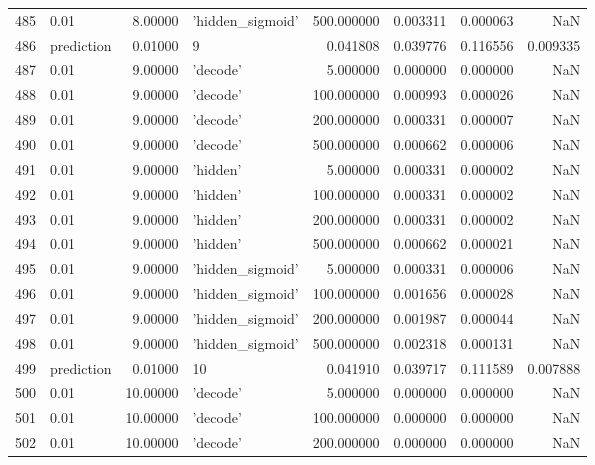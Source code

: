 \documentclass[10pt,a4paper]{article}
\begin{document}
\begin{tabular}{llrlrrrr}
485  &        0.01 &   8.00000 &   'hidden\_sigmoid' &  500.000000 &  0.003311 &  0.000063 &       NaN \\
486  &  prediction &   0.01000 &                  9 &    0.041808 &  0.039776 &  0.116556 &  0.009335 \\
487  &        0.01 &   9.00000 &           'decode' &    5.000000 &  0.000000 &  0.000000 &       NaN \\
488  &        0.01 &   9.00000 &           'decode' &  100.000000 &  0.000993 &  0.000026 &       NaN \\
489  &        0.01 &   9.00000 &           'decode' &  200.000000 &  0.000331 &  0.000007 &       NaN \\
490  &        0.01 &   9.00000 &           'decode' &  500.000000 &  0.000662 &  0.000006 &       NaN \\
491  &        0.01 &   9.00000 &           'hidden' &    5.000000 &  0.000331 &  0.000002 &       NaN \\
492  &        0.01 &   9.00000 &           'hidden' &  100.000000 &  0.000331 &  0.000002 &       NaN \\
493  &        0.01 &   9.00000 &           'hidden' &  200.000000 &  0.000331 &  0.000002 &       NaN \\
494  &        0.01 &   9.00000 &           'hidden' &  500.000000 &  0.000662 &  0.000021 &       NaN \\
495  &        0.01 &   9.00000 &   'hidden\_sigmoid' &    5.000000 &  0.000331 &  0.000006 &       NaN \\
496  &        0.01 &   9.00000 &   'hidden\_sigmoid' &  100.000000 &  0.001656 &  0.000028 &       NaN \\
497  &        0.01 &   9.00000 &   'hidden\_sigmoid' &  200.000000 &  0.001987 &  0.000044 &       NaN \\
498  &        0.01 &   9.00000 &   'hidden\_sigmoid' &  500.000000 &  0.002318 &  0.000131 &       NaN \\
499  &  prediction &   0.01000 &                 10 &    0.041910 &  0.039717 &  0.111589 &  0.007888 \\
500  &        0.01 &  10.00000 &           'decode' &    5.000000 &  0.000000 &  0.000000 &       NaN \\
501  &        0.01 &  10.00000 &           'decode' &  100.000000 &  0.000000 &  0.000000 &       NaN \\
502  &        0.01 &  10.00000 &           'decode' &  200.000000 &  0.000000 &  0.000000 &       NaN \\

\end{tabular}
\end{document}
